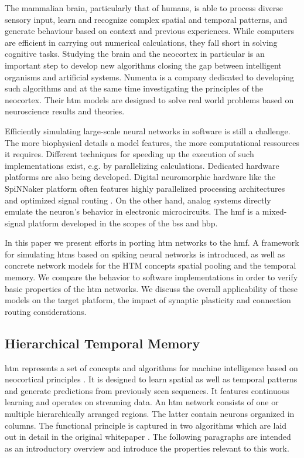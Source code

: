 The mammalian brain, particularly that of humans, is able to process diverse
sensory input, learn and recognize complex spatial and temporal patterns, and
generate behaviour based on context and previous experiences. While computers
are efficient in carrying out numerical calculations, they fall short in solving
cognitive tasks. Studying the brain and the neocortex in particular is an
important step to develop new algorithms closing the gap between intelligent
organisms and artificial systems. Numenta is a company dedicated to developing
such algorithms and at the same time investigating the principles of the
neocortex. Their \gls{htm} models are designed to solve real world problems
based on neuroscience results and theories.

Efficiently simulating large-scale neural networks in software is still a
challenge. The more biophysical details a model features, the more computational
ressources it requires. Different techniques for speeding up the execution of
such implementations exist, e.g. by parallelizing calculations. Dedicated
hardware platforms are also being developed. Digital neuromorphic hardware like
the SpiNNaker platform often features highly parallelized processing
architectures and optimized signal routing \citep{furber2014spinnaker}. On the
other hand, analog systems directly emulate the neuron's behavior in electronic
microcircuits. The \gls{hmf} is a mixed-signal platform developed in the scopes
of the \gls{bss} and \gls{hbp}.

In this paper we present efforts in porting \gls{htm} networks to the \gls{hmf}.
A framework for simulating \glspl{htm} based on spiking neural networks is
introduced, as well as concrete network models for the HTM concepts spatial
pooling and the temporal memory. We compare the behavior to software
implementations in order to verify basic properties of the \gls{htm} networks.
We discuss the overall applicability of these models on the target platform, the
impact of synaptic plasticity and connection routing considerations.

\subsection{Hierarchical Temporal Memory}

\gls{htm} represents a set of concepts and algorithms for machine intelligence
based on neocortical principles \citep{numenta2011htm}. It is designed to learn
spatial as well as temporal patterns and generate predictions from
previously seen sequences. It features continuous learning and operates
on streaming data. An \gls{htm} network consists of one or multiple
hierarchically arranged regions. The latter contain neurons organized in
columns. The functional principle is captured in two algorithms which are laid
out in detail in the original whitepaper \citep{numenta2011htm}. The following
paragraphs are intended as an introductory overview and introduce the
properties relevant to this work.


